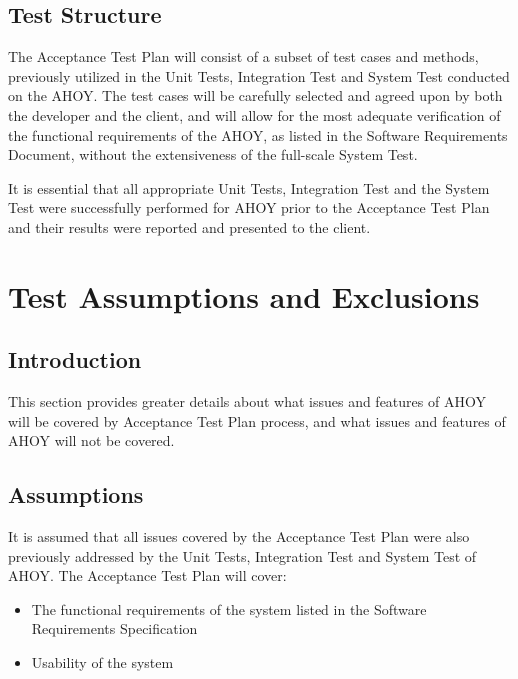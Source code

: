 \documentclass[titlepage]{article}
\begin{document}

\subsection{Test Structure%
    \label{structure}%
}
    The Acceptance Test Plan will consist of a subset of test cases and methods, previously utilized in the Unit Tests, Integration Test and System Test conducted on the AHOY. The test cases will be carefully selected and agreed upon by both the developer and the client, and will allow for the most adequate verification of the functional requirements of the AHOY, as listed in the Software Requirements Document, without the extensiveness of the full-scale System Test.

    It is essential that all appropriate Unit Tests, Integration Test and the System Test were successfully performed for AHOY prior to the Acceptance Test Plan and their results were reported and presented to the client.


\section{Test Assumptions and Exclusions%
    \label{assumptions}%
}


\subsection{Introduction}
    This section provides greater details about what issues and features of AHOY will be covered by Acceptance Test Plan process, and what issues and features of AHOY will not be covered.


\subsection{Assumptions}
    It is assumed that all issues covered by the Acceptance Test Plan were also previously addressed by the Unit Tests, Integration Test and System Test of AHOY. The Acceptance Test Plan will cover:
    \begin{itemize}
        \item The functional requirements of the system listed in the Software Requirements Specification
        \item Usability of the system
    \end{itemize}
\end{document}
